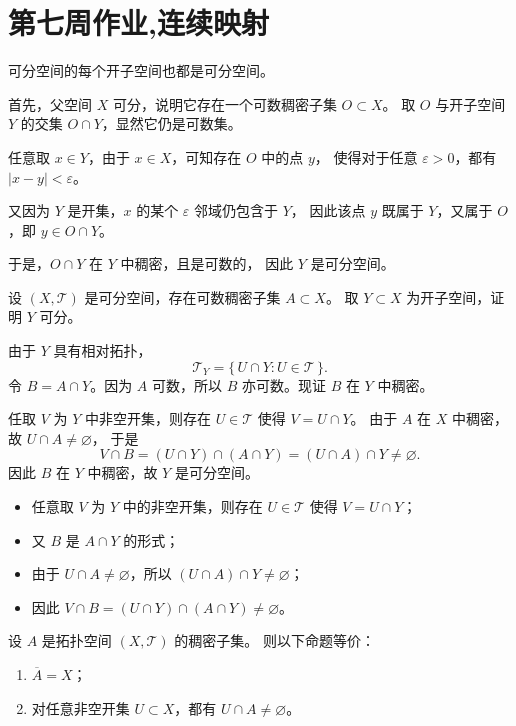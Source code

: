 \section{第七周作业,连续映射}
\begin{homework}[2.1]
可分空间的每个开子空间也都是可分空间。
\end{homework}
\begin{note}
首先，父空间 $X$ 可分，说明它存在一个可数稠密子集 $O\subset X$。  
取 $O$ 与开子空间 $Y$ 的交集 $O\cap Y$，显然它仍是可数集。  

任意取 $x\in Y$，由于 $x\in X$，可知存在 $O$ 中的点 $y$，  
使得对于任意 $\varepsilon>0$，都有 $|x-y|<\varepsilon$。  

又因为 $Y$ 是开集，$x$ 的某个 $\varepsilon$ 邻域仍包含于 $Y$，  
因此该点 $y$ 既属于 $Y$，又属于 $O$，即 $y\in O\cap Y$。  

于是，$O\cap Y$ 在 $Y$ 中稠密，且是可数的，  
因此 $Y$ 是可分空间。    
\end{note}
\begin{solution}
    

设 $(X,\mathcal{T})$ 是可分空间，存在可数稠密子集 $A\subset X$。  
取 $Y\subset X$ 为开子空间，证明 $Y$ 可分。

由于 $Y$ 具有相对拓扑，
\[
\mathcal{T}_Y = \{\,U\cap Y : U\in\mathcal{T}\,\}.
\]
令 $B = A \cap Y$。因为 $A$ 可数，所以 $B$ 亦可数。现证 $B$ 在 $Y$ 中稠密。

任取 $V$ 为 $Y$ 中非空开集，则存在 $U\in\mathcal{T}$ 使得 $V = U\cap Y$。  
由于 $A$ 在 $X$ 中稠密，故 $U\cap A \ne \varnothing$，  
于是
\[
V\cap B = (U\cap Y)\cap (A\cap Y)
= (U\cap A)\cap Y \ne \varnothing.
\]
因此 $B$ 在 $Y$ 中稠密，故 $Y$ 是可分空间。
\end{solution}
\begin{note}
   \begin{itemize}
  \item 任意取 $V$ 为 $Y$ 中的非空开集，则存在 $U \in \mathcal{T}$ 使得 $V = U \cap Y$；
  \item 又 $B$ 是 $A \cap Y$ 的形式；
  \item 由于 $U \cap A \ne \varnothing$，所以 $(U \cap A) \cap Y \ne \varnothing$；
  \item 因此 $V \cap B = (U \cap Y) \cap (A \cap Y) \ne \varnothing$。
\end{itemize}
\end{note}
\begin{theorem}[稠密集的等价条件]
设 $A$ 是拓扑空间 $(X,\mathcal{T})$ 的稠密子集。  
则以下命题等价：
\begin{enumerate}
  \item $\overline{A}=X$；
  \item 对任意非空开集 $U\subset X$，都有 $U\cap A\ne\varnothing$。
\end{enumerate}
\end{theorem}
